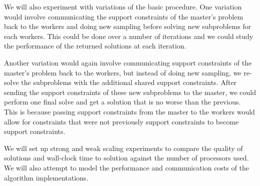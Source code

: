\documentclass[12pt]{article}
\begin{document}
We will also experiment with variations of the basic procedure.
One variation would involve communicating the support constraints of the master's problem back to the workers and doing new sampling before solving new subproblems for each workers.
This could be done over a number of iterations and we could study the performance of the returned solutions at each iteration.

Another variation would again involve communicating support constraints of the master's problem back to the workers, but instead of doing new sampling, we re-solve the subproblems with the additional shared support constraints.
After sending the support constraints of these new subproblems to the master, we could perform one final solve and get a solution that is no worse than the previous.
This is because passing support constraints from the master to the workers would allow for constraints that were not previously support constraints to become support constraints.

We will set up strong and weak scaling experiments to compare the quality of solutions and 
wall-clock time to solution against the number of processors used.  We will also attempt to
model the performance and communication costs of the algorithm implementations.


 
\end{document}
